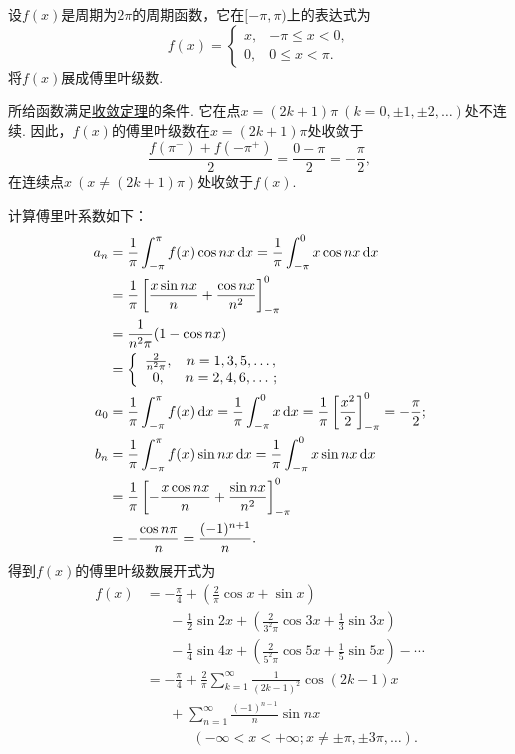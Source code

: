 \begin{example}
设\(f(x)\)是周期为\(2\pi\)的周期函数，它在\([-\pi,\pi)\)上的表达式为\[
f(x) = \left\{ \begin{array}{cc}
x, & -\pi \leq x < 0, \\
0, & 0 \leq x < \pi.
\end{array} \right.
\]
将\(f(x)\)展成傅里叶级数.
\begin{solution}
所给函数满足\hyperref[theorem:无穷级数.傅里叶级数收敛的狄利克雷充分条件]{收敛定理}的条件.
它在点\(x=(2k+1)\pi\ (k=0,\pm1,\pm2,\dotsc)\)处不连续.
因此，\(f(x)\)的傅里叶级数在\(x=(2k+1)\pi\)处收敛于\[
\frac{f(\pi^-)+f(-\pi^+)}{2} = \frac{0-\pi}{2} = -\frac{\pi}{2},
\]在连续点\(x\ (x\neq(2k+1)\pi)\)处收敛于\(f(x)\).

计算傅里叶系数如下：\begin{align*}
a_n &= \frac{1}{\pi} \int_{-\pi}^{\pi} f(x) \cos nx \dd{x}
= \frac{1}{\pi} \int_{-\pi}^0 x \cos nx \dd{x} \\
&= \frac{1}{\pi} \left[ \frac{x \sin nx}{n} + \frac{\cos nx}{n^2} \right]_{-\pi}^0 \\
&= \frac{1}{n^2 \pi} (1-\cos nx) \\
&= \left\{ \begin{array}{cc}
\frac{2}{n^2 \pi}, & n=1,3,5,\dotsc, \\
0, & n=2,4,6,\dotsc;
\end{array} \right. \\
a_0 &= \frac{1}{\pi} \int_{-\pi}^{\pi} f(x) \dd{x}
= \frac{1}{\pi} \int_{-\pi}^0 x \dd{x}
= \frac{1}{\pi} \left[ \frac{x^2}{2} \right]_{-\pi}^0 = -\frac{\pi}{2}; \\
b_n &= \frac{1}{\pi} \int_{-\pi}^{\pi} f(x) \sin nx \dd{x}
= \frac{1}{\pi} \int_{-\pi}^0 x \sin nx \dd{x} \\
&= \frac{1}{\pi} \left[ -\frac{x \cos nx}{n} + \frac{\sin nx}{n^2} \right]_{-\pi}^0 \\
&= -\frac{\cos n\pi}{n} = \frac{(-1)^{n+1}}{n}.
\end{align*}
得到\(f(x)\)的傅里叶级数展开式为\begin{align*}
f(x) &= -\frac{\pi}{4} + \left(\frac{2}{\pi} \cos x + \sin x\right) \\
&\hspace{20pt}-\frac{1}{2}\sin 2x + \left(\frac{2}{3^2\pi}\cos 3x + \frac{1}{3}\sin 3x\right) \\
&\hspace{20pt}-\frac{1}{4}\sin 4x + \left(\frac{2}{5^2\pi}\cos 5x + \frac{1}{5}\sin 5x\right)
-\dotsb \\
&= -\frac{\pi}{4} + \frac{2}{\pi} \sum\limits_{k=1}^\infty \frac{1}{(2k-1)^2} \cos(2k-1)x \\
&\hspace{20pt}+\sum\limits_{n=1}^\infty \frac{(-1)^{n-1}}{n} \sin nx \\
&\hspace{40pt}(-\infty<x<+\infty; x\neq\pm\pi,\pm3\pi,\dotsc).
\end{align*}
\end{solution}
\end{example}

